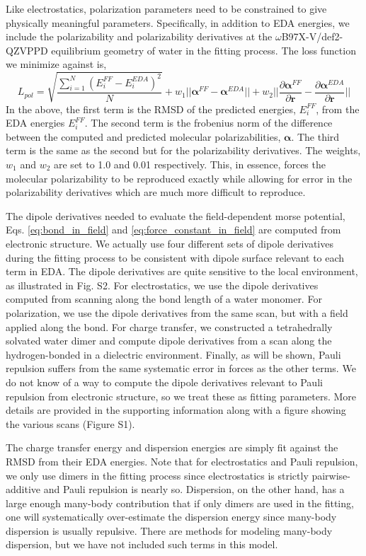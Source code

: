 \documentclass[journal=jacsat,manuscript=article]{achemso}
\begin{document}
Like electrostatics, polarization parameters need to be constrained to give physically meaningful
parameters. Specifically, in addition to EDA energies, we include the polarizability and polarizability derivatives
at the $\omega$B97X-V/def2-QZVPPD equilibrium geometry of water in the fitting process.
The loss function we minimize against is,
\begin{equation}
  L_{pol}=\sqrt{\frac{\sum_{i=1}^{N}(E_i^{FF}-E_i^{EDA})^2}{N}} + w_1||\bm{\alpha}^{FF}-\bm{\alpha}^{EDA}||+w_2||\frac{\partial\bm{\alpha}^{FF}}{\partial \bm{r}}-\frac{\partial\bm{\alpha}^{EDA}}{\partial \bm{r}}||
\label{eq:pol_loss}
\end{equation}
\noindent
In the above, the first term is the RMSD of the predicted energies, $E_i^{FF}$, from the
EDA energies $E_i^{FF}$. The second term is the frobenius norm of the difference between the
computed and predicted molecular polarizabilities, $\bm{\alpha}$. The third term is the same as
the second but for the polarizability derivatives. The weights, $w_1$ and $w_2$ are set to
1.0 and 0.01 respectively. This, in essence, forces the molecular polarizability to be
reproduced exactly while allowing for error in the polarizability derivatives which are much
more difficult to reproduce.

The dipole derivatives needed to evaluate the field-dependent morse potential, Eqs. \ref{eq:bond_in_field} and \ref{eq:force_constant_in_field}
are computed from electronic structure. We actually use four different sets of dipole derivatives
during the fitting process to be consistent with dipole surface relevant to each term in EDA.
The dipole derivatives are quite sensitive to the local environment, as illustrated in Fig. S2.
For electrostatics, we use the dipole derivatives computed from scanning along the 
bond length of a water monomer. For polarization, we use the dipole derivatives from
the same scan, but with a field applied along the  bond. For charge transfer,
we constructed a tetrahedrally solvated water dimer and compute dipole derivatives from a
scan along the hydrogen-bonded  in a dielectric environment. Finally, as will be shown,
Pauli repulsion suffers from the same systematic error in forces as the other terms. We do not
know of a way to compute the dipole derivatives relevant to Pauli repulsion from electronic
structure, so we treat these as fitting parameters. More details are provided
in the supporting information along with a figure showing the various scans (Figure S1).

The charge transfer energy and dispersion energies are simply fit against the RMSD
from their EDA energies. Note that for electrostatics and Pauli repulsion, we only use dimers in
the fitting process since electrostatics is strictly pairwise-additive and Pauli repulsion is nearly so.
Dispersion, on the other hand, has a large enough many-body contribution that if only dimers
are used in the fitting, one will systematically over-estimate the dispersion energy since
many-body dispersion is usually repulsive. There are methods for modeling many-body dispersion,
but we have not included such terms in this model.\cite{anatole2010two,van2018new}
\end{document}
